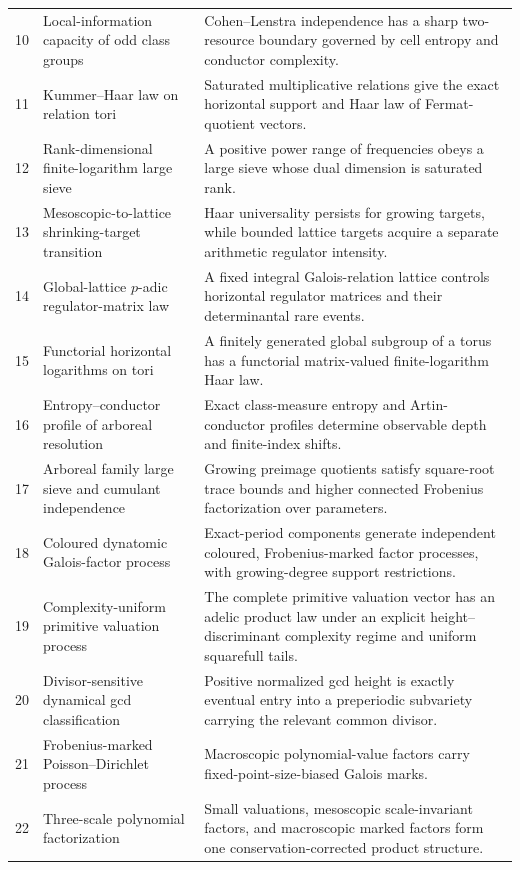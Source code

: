 \documentclass[11pt]{article}
\begin{document}
\begin{longtable}{@{}p{}p{}p{}@{}}
10 & Local-information capacity of odd class groups & Cohen--Lenstra independence has a sharp two-resource boundary governed by cell entropy and conductor complexity.\\
11 & Kummer--Haar law on relation tori & Saturated multiplicative relations give the exact horizontal support and Haar law of Fermat-quotient vectors.\\
12 & Rank-dimensional finite-logarithm large sieve & A positive power range of frequencies obeys a large sieve whose dual dimension is saturated rank.\\
13 & Mesoscopic-to-lattice shrinking-target transition & Haar universality persists for growing targets, while bounded lattice targets acquire a separate arithmetic regulator intensity.\\
14 & Global-lattice $p$-adic regulator-matrix law & A fixed integral Galois-relation lattice controls horizontal regulator matrices and their determinantal rare events.\\
15 & Functorial horizontal logarithms on tori & A finitely generated global subgroup of a torus has a functorial matrix-valued finite-logarithm Haar law.\\
16 & Entropy--conductor profile of arboreal resolution & Exact class-measure entropy and Artin-conductor profiles determine observable depth and finite-index shifts.\\
17 & Arboreal family large sieve and cumulant independence & Growing preimage quotients satisfy square-root trace bounds and higher connected Frobenius factorization over parameters.\\
18 & Coloured dynatomic Galois-factor process & Exact-period components generate independent coloured, Frobenius-marked factor processes, with growing-degree support restrictions.\\
19 & Complexity-uniform primitive valuation process & The complete primitive valuation vector has an adelic product law under an explicit height--discriminant complexity regime and uniform squarefull tails.\\
20 & Divisor-sensitive dynamical gcd classification & Positive normalized gcd height is exactly eventual entry into a preperiodic subvariety carrying the relevant common divisor.\\
21 & Frobenius-marked Poisson--Dirichlet process & Macroscopic polynomial-value factors carry fixed-point-size-biased Galois marks.\\
22 & Three-scale polynomial factorization & Small valuations, mesoscopic scale-invariant factors, and macroscopic marked factors form one conservation-corrected product structure.\\

\end{longtable}
\end{document}
